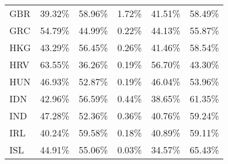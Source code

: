 \documentclass[a4paper,11pt]{article}
\begin{document}
\begin{table}[h]
\begin{tabular}{lrrrrr}
    GBR   & 39.32\% & 58.96\% & 1.72\% & 41.51\% & 58.49\% \\
    GRC   & 54.79\% & 44.99\% & 0.22\% & 44.13\% & 55.87\% \\
    HKG   & 43.29\% & 56.45\% & 0.26\% & 41.46\% & 58.54\% \\
    HRV   & 63.55\% & 36.26\% & 0.19\% & 56.70\% & 43.30\% \\
    HUN   & 46.93\% & 52.87\% & 0.19\% & 46.04\% & 53.96\% \\
    IDN   & 42.96\% & 56.59\% & 0.44\% & 38.65\% & 61.35\% \\
    IND   & 47.28\% & 52.36\% & 0.36\% & 40.76\% & 59.24\% \\
    IRL   & 40.24\% & 59.58\% & 0.18\% & 40.89\% & 59.11\% \\
    ISL   & 44.91\% & 55.06\% & 0.03\% & 34.57\% & 65.43\% \\
    \end{tabular}
\end{table}
\end{document}
